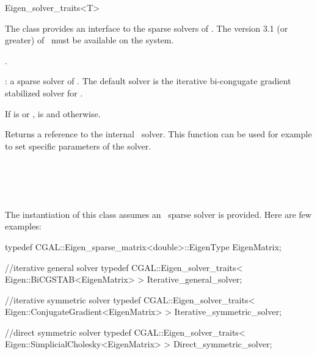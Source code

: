 \ccRefPageBegin
\begin{ccRefClass}{Eigen_solver_traits<T>}


\ccDefinition

The class  provides an interface to the sparse solvers of \eigen. 
The version 3.1 (or greater) of \eigen\ must be available on the system.


\ccIsModel
{}.

\ccParameters
{}: a sparse solver of \eigen. The default solver is the iterative bi-congugate gradient stabilized solver
 for .

\ccTypes
{}
{If  is  or ,  is 
and  otherwise.
}

\ccOperations
{}
{
Returns a reference to the internal \eigen\ solver. This function can be used for example to set specific parameters of the solver.
}

\ccSeeAlso
{}  \\
  \\
  \\
\eigenpage\\

\ccExample
The instantiation of this class assumes an \eigen\ sparse solver is provided. Here are few examples:

\begin{ccExampleCode}
typedef CGAL::Eigen_sparse_matrix<double>::EigenType EigenMatrix;

//iterative general solver
typedef CGAL::Eigen_solver_traits< Eigen::BiCGSTAB<EigenMatrix> > Iterative_general_solver;

//iterative symmetric solver
typedef CGAL::Eigen_solver_traits< Eigen::ConjugateGradient<EigenMatrix> > Iterative_symmetric_solver;

//direct symmetric solver
typedef CGAL::Eigen_solver_traits< Eigen::SimplicialCholesky<EigenMatrix> > Direct_symmetric_solver;
\end{ccExampleCode}


\end{ccRefClass}

\ccRefPageEnd


